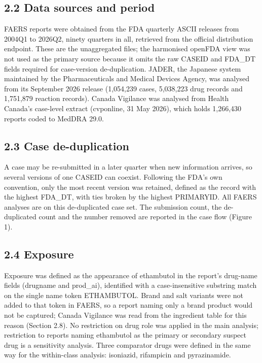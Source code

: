 \documentclass[12pt,a4paper]{article}
\begin{document}
\subsection*{2.2 Data sources and period}

FAERS reports were obtained from the FDA quarterly ASCII releases from 2004Q1 to 2026Q2, ninety quarters in all, retrieved from the official distribution endpoint. These are the unaggregated files; the harmonised openFDA view was not used as the primary source because it omits the raw CASEID and FDA\_DT fields required for case-version de-duplication. JADER, the Japanese system maintained by the Pharmaceuticals and Medical Devices Agency, was analysed from its September 2026 release (1,054,239 cases, 5,038,223 drug records and 1,751,879 reaction records). Canada Vigilance was analysed from Health Canada's case-level extract (cvponline, 31 May 2026), which holds 1,266,430 reports coded to MedDRA 29.0.

\subsection*{2.3 Case de-duplication}

A case may be re-submitted in a later quarter when new information arrives, so several versions of one CASEID can coexist. Following the FDA's own convention, only the most recent version was retained, defined as the record with the highest FDA\_DT, with ties broken by the highest PRIMARYID. All FAERS analyses are on this de-duplicated case set. The submission count, the de-duplicated count and the number removed are reported in the case flow (Figure 1).

\subsection*{2.4 Exposure}

Exposure was defined as the appearance of ethambutol in the report's drug-name fields (drugname and prod\_ai), identified with a case-insensitive substring match on the single name token ETHAMBUTOL. Brand and salt variants were not added to that token in FAERS, so a report naming only a brand product would not be captured; Canada Vigilance was read from the ingredient table for this reason (Section 2.8). No restriction on drug role was applied in the main analysis; restriction to reports naming ethambutol as the primary or secondary suspect drug is a sensitivity analysis. Three comparator drugs were defined in the same way for the within-class analysis: isoniazid, rifampicin and pyrazinamide.
\end{document}
